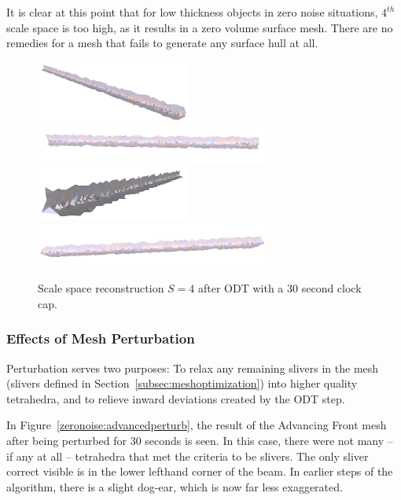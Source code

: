 \documentclass[12pt]{drexelthesis}
\let\Oldsubsubsection\subsubsection
\renewcommand{\subsubsection}{\FloatBarrier\Oldsubsubsection}
\begin{document}
It is clear at this point that for low thickness objects in zero noise situations, $4^{th}$ scale space is too high, as it results in a zero volume surface mesh. There are no remedies for a mesh that fails to generate any surface hull at all.

\begin{figure}[!ht]
	\centering
		\includegraphics[width=2in]{simulated-lab-scan/0noise/optimized/scalespace4odt00.png}
		\includegraphics[width=3in]{simulated-lab-scan/0noise/optimized/scalespace4odt01.png}
		\includegraphics[width=2in]{simulated-lab-scan/0noise/optimized/scalespace4odt02.png}
		\includegraphics[width=3in]{simulated-lab-scan/0noise/optimized/scalespace4odt03.png}
		\caption[Scale space reconstruction $S = 4$ after ODT with a 30 second clock cap]{\centering Scale space reconstruction $S = 4$ after ODT with a 30 second clock cap.}
	\label{zeronoise:scalespace4odt}
\end{figure}

\subsubsection{Effects of Mesh Perturbation}

Perturbation serves two purposes: To relax any remaining slivers in the mesh (slivers defined in Section~\ref{subsec:meshoptimization}) into higher quality tetrahedra, and to relieve inward deviations created by the ODT step.

In Figure~\ref{zeronoise:advancedperturb}, the result of the Advancing Front mesh after being perturbed for 30 seconds is seen. In this case, there were not many -- if any at all -- tetrahedra that met the criteria to be slivers. The only sliver correct visible is in the lower lefthand corner of the beam. In earlier steps of the algorithm, there is a slight dog-ear, which is now far less exaggerated.
\end{document}
